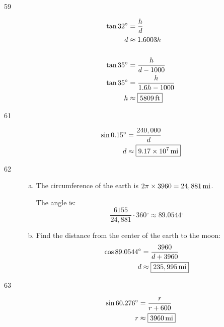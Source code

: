 \documentclass{exam}
\newcommand{\dg}{\ensuremath{^\circ}}
\begin{document}
\begin{description}
      \item[59]
        \begin{align*}
            \tan 32 \dg & = \frac{h}{d} \\
            d           & \approx 1.6003 h \\
            \\
            \tan 35 \dg & = \frac{h}{d - 1000} \\
            \tan 35 \dg & = \frac{h}{1.6h - 1000} \\
            h           & \approx \boxed{ \unit[5809]{ft} } \\
        \end{align*}

      \item[61]
        \begin{align*}
            \sin 0.15 \dg & = \frac{240,000}{d} \\
            d           & \approx \boxed{ \unit[ 9.17 \times 10^7 ]{mi} }  \\
        \end{align*}

      \item[62]
        \begin{enumerate}[(a)]
          \item The circumference of the earth is $2 \pi \times 3960 = \unit[24,881]{mi}$.

            The angle is:
            \[
              \frac{6155}{24,881} \cdot 360 \dg \approx \boxed{ 89.0544 \dg }
            \]

          \item Find the distance from the center of the earth to the moon:
            \begin{align*}
              \cos 89.0544 \dg & = \frac{3960}{d + 3960} \\
              d                & \approx \boxed{ \unit[ 235,995 ]{mi} } \\
            \end{align*}

        \end{enumerate}

        \item[63]
          \begin{align*}
            \sin 60.276 \dg & = \frac{r}{r + 600} \\
            r               & \approx \boxed{ \unit[3960]{mi} } \\
          \end{align*}


\end{description}
\end{document}
